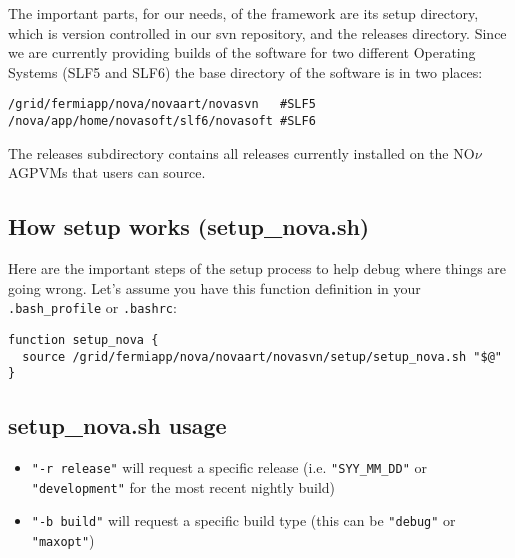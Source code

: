 \documentclass[letterpaper,10pt]{article}
\newcommand{\nova}{NO$\nu$A}
\newcommand{\novas}{\nova \space}
\begin{document}
The important parts, for our needs, of the framework are its setup directory, which is version controlled in our svn repository, and the releases directory. Since we are currently providing builds of the software for two different Operating Systems (SLF5 and SLF6) the base directory of the software is in two places:
\begin{verbatim}
/grid/fermiapp/nova/novaart/novasvn   #SLF5
/nova/app/home/novasoft/slf6/novasoft #SLF6
\end{verbatim}

The releases subdirectory contains all releases currently installed on the \novas GPVMs that users can source.


\subsection{How setup works (setup\_nova.sh)}
Here are the important steps of the setup process to help debug where things are going wrong. Let's assume you have this function definition in your \verb|.bash_profile| or \verb|.bashrc|:
\begin{verbatim}
function setup_nova {
  source /grid/fermiapp/nova/novaart/novasvn/setup/setup_nova.sh "$@"
}
\end{verbatim}

\subsection{setup\_nova.sh usage}
\begin{itemize}
\item \verb|"-r release"| will request a specific release (i.e. \verb|"SYY_MM_DD"| or \verb|"development"| for the most recent nightly build)
\item \verb|"-b build"| will request a specific build type (this can be \verb|"debug"| or \verb|"maxopt"|)
\end{itemize}
\end{document}
